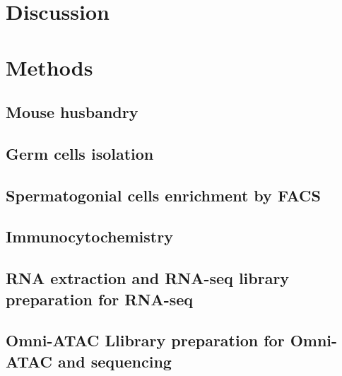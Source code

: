 \documentclass[12pt,twoside]{reedthesis}
\begin{document}
\newpage

\hypertarget{discussion}{%
\section{Discussion}\label{discussion}}

\newpage

\hypertarget{methods-1}{%
\section{Methods}\label{methods-1}}

\hypertarget{mouse-husbandry}{%
\subsection{Mouse husbandry}\label{mouse-husbandry}}

\hypertarget{germ-cells-isolation}{%
\subsection{Germ cells isolation}\label{germ-cells-isolation}}

\hypertarget{spermatogonial-cells-enrichment-by-facs}{%
\subsection{Spermatogonial cells enrichment by FACS}\label{spermatogonial-cells-enrichment-by-facs}}

\hypertarget{immunocytochemistry}{%
\subsection{Immunocytochemistry}\label{immunocytochemistry}}

\hypertarget{rna-extraction-and-rna-seq-library-preparation-for-rna-seq}{%
\subsection{RNA extraction and RNA-seq library preparation for RNA-seq}\label{rna-extraction-and-rna-seq-library-preparation-for-rna-seq}}

\hypertarget{omni-atac-llibrary-preparation-for-omni-atac-and-sequencing}{%
\subsection{Omni-ATAC Llibrary preparation for Omni-ATAC and sequencing}\label{omni-atac-llibrary-preparation-for-omni-atac-and-sequencing}}
\end{document}
